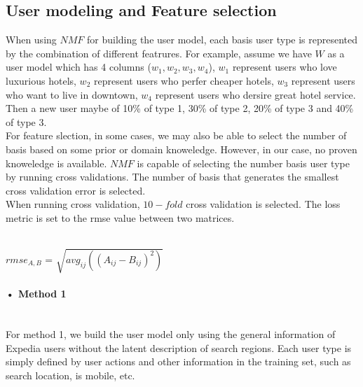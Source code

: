 \documentclass[11pt]{article} %
\begin{document}
\subsection{User modeling and Feature selection}
When using $NMF$ for building the user model, each basis user type is represented by the combination of different featrures. For example, assume we have $W$ as a user model which has 4 columns ($w_{1}, w_{2}, w_{3}, w_{4}$), $w_{1}$ represent users who love luxurious hotels, $w_{2}$ represent users who perfer cheaper hotels, $w_{3}$ represent users who want to live in downtown, $w_{4}$ represent users who dersire great hotel service. Then a new user maybe of 10\% of type 1, 30\% of type 2, 20\% of type 3 and 40\% of type 3.\\    
For feature slection, in some cases, we may also be able to select the number of basis based on some prior or domain knoweledge. However, in our case, no proven knoweledge is available. $NMF$ is capable of selecting the number basis user type by running cross validations. The number of basis that generates the smallest cross validation error is selected.\\
When running cross validation, $10-fold$ cross validation is selected. The loss metric is set to the rmse value between two matrices.\\\\
\centerline{$rmse_{A,B}$ = $\sqrt{avg_{ij}((A_{ij}-B_{ij})^{2})}$}\paragraph{• Method 1}\mbox{}\\
For method 1, we build the user model only using the general information of Expedia users without the latent description of search regions. Each user type is simply defined by user actions and other information in the training set, such as search location, is mobile, etc.\\
\end{document}
